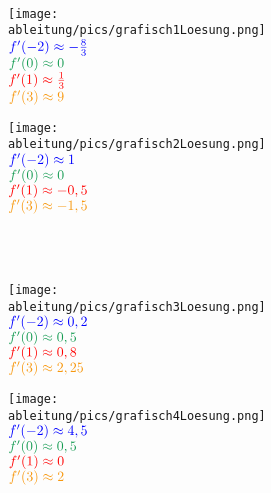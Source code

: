 \documentclass[a4paper,12pt, headsepline, ngerman]{scrartcl}
\theoremstyle{definition}
\begin{document}
\begin{Answer}[ref=grafischABlA1]\\
\begin{minipage}{\textwidth}
	\begin{minipage}{0.49\textwidth}
		\centering\texttt{[image: \\ableitung/pics/grafisch1Loesung.png]}\\
		\(\textcolor{blue}{f'(-2)\approx-\frac{8}{3}}\)\\
		\(\textcolor{ForestGreen}{f'(0)\approx0}\)\\
		\(\textcolor{red}{f'(1)\approx\frac{1}{3}}\)\\
		\(\textcolor{YellowOrange}{f'(3)\approx9}\)\\
	\end{minipage}
	\begin{minipage}{0.49\textwidth}
		\centering\texttt{[image: \\ableitung/pics/grafisch2Loesung.png]}\\
		\(\textcolor{blue}{f'(-2)\approx1}\)\\
		\(\textcolor{ForestGreen}{f'(0)\approx0}\)\\
		\(\textcolor{red}{f'(1)\approx-0,5}\)\\
		\(\textcolor{YellowOrange}{f'(3)\approx-1,5}\)\\
	\end{minipage}
\end{minipage}\\\phantom{x}\\
\begin{minipage}{\textwidth}
	\begin{minipage}{0.49\textwidth}
		\centering\texttt{[image: \\ableitung/pics/grafisch3Loesung.png]}\\
		\(\textcolor{blue}{f'(-2)\approx0,2}\)\\
		\(\textcolor{ForestGreen}{f'(0)\approx0,5}\)\\
		\(\textcolor{red}{f'(1)\approx0,8}\)\\
		\(\textcolor{YellowOrange}{f'(3)\approx2,25}\)\\
	\end{minipage}
	\begin{minipage}{0.49\textwidth}
		\centering\texttt{[image: \\ableitung/pics/grafisch4Loesung.png]}\\
		\(\textcolor{blue}{f'(-2)\approx4,5}\)\\
		\(\textcolor{ForestGreen}{f'(0)\approx0,5}\)\\
		\(\textcolor{red}{f'(1)\approx0}\)\\
		\(\textcolor{YellowOrange}{f'(3)\approx2}\)\\
	\end{minipage}\\
\end{minipage}
\end{Answer}
\end{document}
